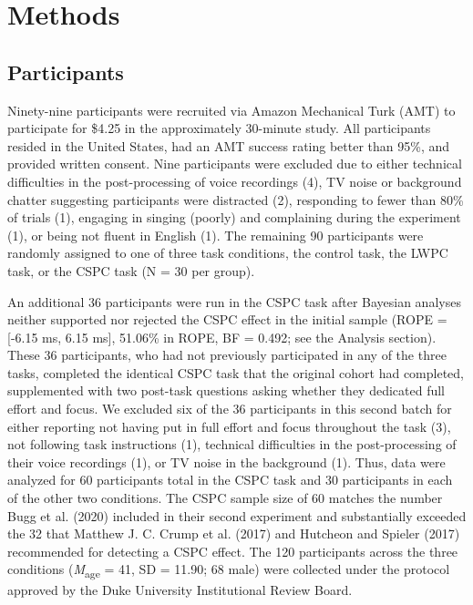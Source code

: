 \documentclass[
  ,man,floatsintext]{apa6}
\begin{document}
\hypertarget{methods}{%
\section{Methods}\label{methods}}

\hypertarget{participants}{%
\subsection{Participants}\label{participants}}

Ninety-nine participants were recruited via Amazon Mechanical Turk (AMT) to participate for \$4.25 in the approximately 30-minute study. All participants resided in the United States, had an AMT success rating better than 95\%, and provided written consent. Nine participants were excluded due to either technical difficulties in the post-processing of voice recordings (4), TV noise or background chatter suggesting participants were distracted (2), responding to fewer than 80\% of trials (1), engaging in singing (poorly) and complaining during the experiment (1), or being not fluent in English (1). The remaining 90 participants were randomly assigned to one of three task conditions, the control task, the LWPC task, or the CSPC task (N = 30 per group).

An additional 36 participants were run in the CSPC task after Bayesian analyses neither supported nor rejected the CSPC effect in the initial sample (ROPE = {[}-6.15 ms, 6.15 ms{]}, 51.06\% in ROPE, BF = 0.492; see the Analysis section). These 36 participants, who had not previously participated in any of the three tasks, completed the identical CSPC task that the original cohort had completed, supplemented with two post-task questions asking whether they dedicated full effort and focus. We excluded six of the 36 participants in this second batch for either reporting not having put in full effort and focus throughout the task (3), not following task instructions (1), technical difficulties in the post-processing of their voice recordings (1), or TV noise in the background (1). Thus, data were analyzed for 60 participants total in the CSPC task and 30 participants in each of the other two conditions. The CSPC sample size of 60 matches the number Bugg et al. (2020) included in their second experiment and substantially exceeded the 32 that Matthew J. C. Crump et al. (2017) and Hutcheon and Spieler (2017) recommended for detecting a CSPC effect. The 120 participants across the three conditions (\emph{M}\textsubscript{age} = 41, SD = 11.90; 68 male) were collected under the protocol approved by the Duke University Institutional Review Board.
\end{document}
